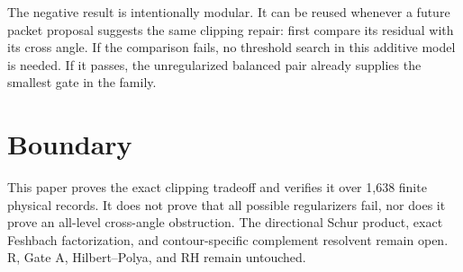 \documentclass[12pt]{article}
\theoremstyle{remark}
\begin{document}
The negative result is intentionally modular.  It can be reused whenever a
future packet proposal suggests the same clipping repair: first compare its
residual with its cross angle.  If the comparison fails, no threshold search
in this additive model is needed.  If it passes, the unregularized balanced
pair already supplies the smallest gate in the family.

\section{Boundary}

This paper proves the exact clipping tradeoff and verifies it over 1,638
finite physical records.  It does not prove that all possible regularizers
fail, nor does it prove an all-level cross-angle obstruction.  The directional
Schur product, exact Feshbach factorization, and contour-specific complement
resolvent remain open.  R, Gate A, Hilbert--Polya, and RH remain untouched.



\end{document}
